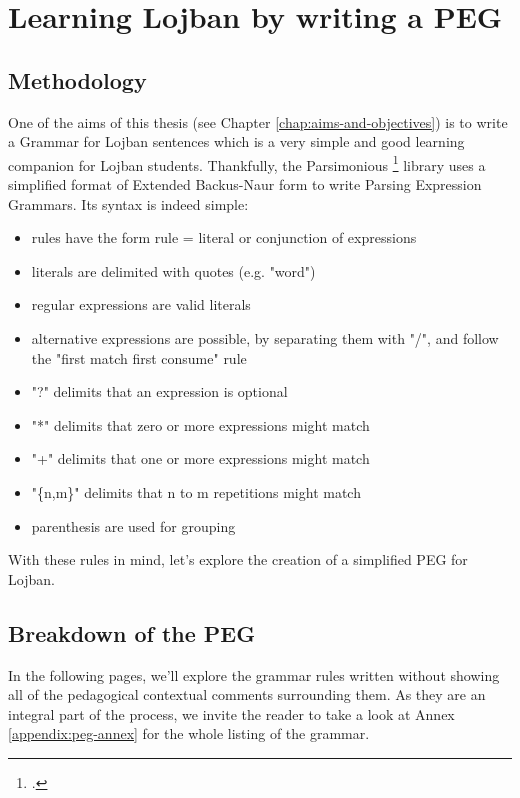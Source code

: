 \chapter{Learning Lojban by writing a PEG}
\label{chap:writing-a-peg}

\section{Methodology}

One of the aims of this thesis (see Chapter \ref{chap:aims-and-objectives}) is to write a Grammar for Lojban sentences which is
a very simple and good learning companion for Lojban students.
Thankfully, the Parsimonious \footcite{parsimonious} library uses a simplified format of Extended Backus-Naur form to write
Parsing Expression Grammars. Its syntax is indeed simple:

\begin{itemize}
    \item rules have the form rule = literal or conjunction of expressions
    \item literals are delimited with quotes (e.g. "word")
    \item regular expressions are valid literals
    \item alternative expressions are possible, by separating them with "/", and follow the "first match first consume" rule
    \item "?" delimits that an expression is optional
    \item "*" delimits that zero or more expressions might match
    \item "+" delimits that one or more expressions might match
    \item "\{n,m\}" delimits that n to m repetitions might match
    \item parenthesis are used for grouping
\end{itemize}

With these rules in mind, let's explore the creation of a simplified PEG for Lojban.

\newpage

\section{Breakdown of the PEG}

In the following pages, we'll explore the grammar rules written without showing all of the pedagogical contextual comments
surrounding them. As they are an integral part of the process, we invite the reader to take a look at Annex \ref{appendix:peg-annex}
for the whole listing of the grammar.

